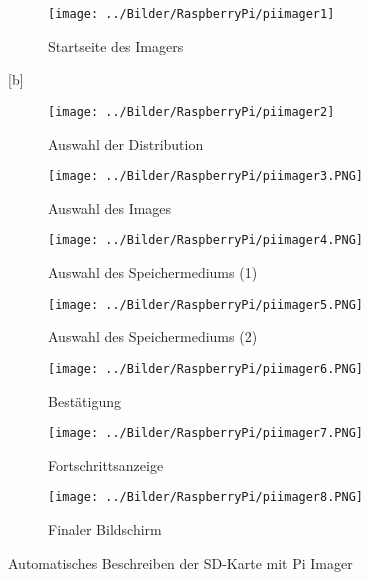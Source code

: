 \begin{figure}[htb]
  \centering

  \begin{subfigure}{.5\linewidth}
     \caption{Startseite des Imagers}\label{fig:face-input}
     \texttt{[image: ../Bilder/RaspberryPi/piimager1]}
  \end{subfigure}[b]
  \begin{subfigure}{.5\linewidth}  
    \caption{Auswahl der Distribution}\label{fig:face-output}
    \texttt{[image: ../Bilder/RaspberryPi/piimager2]}
  \end{subfigure}
  \begin{subfigure}{.5\linewidth}
    \caption{Auswahl des Images}\label{fig:face-input}\texttt{[image: ../Bilder/RaspberryPi/piimager3.PNG]}
  \end{subfigure}
  \begin{subfigure}{.5\linewidth}
	\caption{Auswahl des Speichermediums (1)}\label{fig:face-output}\texttt{[image: ../Bilder/RaspberryPi/piimager4.PNG]}
  \end{subfigure}
  \begin{subfigure}{.5\linewidth}
	\caption{Auswahl des Speichermediums (2)}\label{fig:face-input}\texttt{[image: ../Bilder/RaspberryPi/piimager5.PNG]}
  \end{subfigure}
  \begin{subfigure}{.5\linewidth}
	\caption{Bestätigung}\label{fig:face-output}\texttt{[image: ../Bilder/RaspberryPi/piimager6.PNG]}
  \end{subfigure}
  \begin{subfigure}{.5\linewidth}
	\caption{Fortschrittsanzeige}\label{fig:face-input}\texttt{[image: ../Bilder/RaspberryPi/piimager7.PNG]}
  \end{subfigure}
  \begin{subfigure}{.5\linewidth}
	\caption{Finaler Bildschirm}\label{fig:face-output}\texttt{[image: ../Bilder/RaspberryPi/piimager8.PNG]}
 \end{subfigure}
 
	\caption{Automatisches Beschreiben der SD-Karte mit Pi Imager}
	\label{fig:piimager}
\end{figure}


